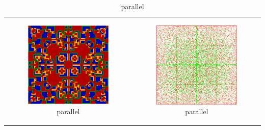 \begin{table}
\begin{tabular}{c c}
		
		\begin{subfigure}[b]{0.4\textwidth}
			\centering
			\includegraphics[width=.7\textwidth, angle=0]{./fig/par_SG_436steps_java.png}
			\caption{parallel}
			\label{fig:pd_par}
		\end{subfigure}
    	&
		\begin{subfigure}[b]{0.4\textwidth}
			\centering
			\includegraphics[width=.7\textwidth, angle=0]{./fig/par_HAC_100_000_500steps_java.png}
			\caption{parallel}
			\label{fig:hac_par}
		\end{subfigure}
    	\\
    	
		

\end{tabular}
\end{table}
